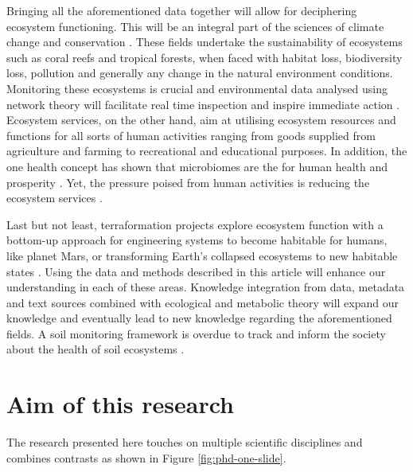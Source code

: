 Bringing all the aforementioned data together will allow for deciphering ecosystem functioning.
This will be an integral part of the sciences of climate change
and conservation \parencite{cavicchioli2019scientists}. These fields undertake the
sustainability of ecosystems such as coral reefs and tropical forests, when
faced with habitat loss, biodiversity loss, pollution and generally any change
in the natural environment conditions. Monitoring these ecosystems is crucial
and environmental data analysed using network theory will facilitate real time
inspection and inspire immediate action \parencite{derocles2018Biomonitoring}.
Ecosystem services, on the other hand, aim at utilising ecosystem resources
and functions for all sorts of human activities ranging from goods supplied
from agriculture and farming \parencite{alvarez-silva2017Compartmentalized} to
recreational and educational purposes. In addition, the one health concept has
shown that microbiomes are the for human health and prosperity
\parencite{banerjee2023Soil, lehmann2020concept}. Yet, the pressure poised from human activities
is reducing the ecosystem services \parencite{rillig2023Increasing}.


Last but not least, terraformation
projects explore ecosystem function with a bottom-up approach for engineering
systems to become habitable for humans, like planet Mars, or transforming
Earth's collapsed ecosystems to new habitable states
\parencite{conde-pueyo2020Synthetic}. Using the data and methods described in this
article will enhance our understanding in each of these areas. Knowledge
integration from data, metadata and text sources combined with ecological and
metabolic theory will expand our knowledge and eventually lead to new
knowledge regarding the aforementioned fields. A soil monitoring framework 
is overdue to track and inform the society about the health of 
soil ecosystems \parencite{guerra2021tracking}.

\section{Aim of this research}
\label{sec:aim}

The research presented here touches on multiple scientific disciplines and
combines contrasts as shown in Figure \ref{fig:phd-one-slide}. 


